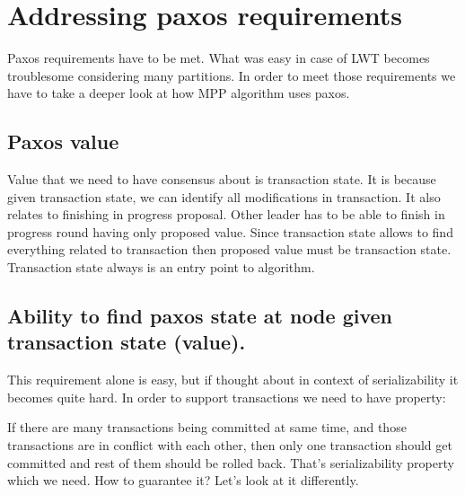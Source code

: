















\section{Addressing paxos requirements}
Paxos requirements have to be met. What was easy in case of LWT becomes troublesome considering many partitions. In order to meet those requirements we have to take a deeper look at how MPP algorithm uses paxos.


\subsection{Paxos value}
Value that we need to have consensus about is transaction state. It is because given transaction state, we can identify all modifications in transaction. It also relates to finishing in progress proposal. Other leader has to be able to finish in progress round having only proposed value. Since transaction state allows to find everything related to transaction then proposed value must be transaction state. Transaction state always is an entry point to algorithm.


\subsection{Ability to find paxos state at node given transaction state (value).}
This requirement alone is easy, but if thought about in context of serializability it becomes quite hard. In order to support transactions we need to have property:


If there are many transactions being committed at same time, and those transactions are in conflict with each other, then only one transaction should get committed and rest of them should be rolled back. 
That’s serializability property which we need. How to guarantee it? Let’s look at it differently.


